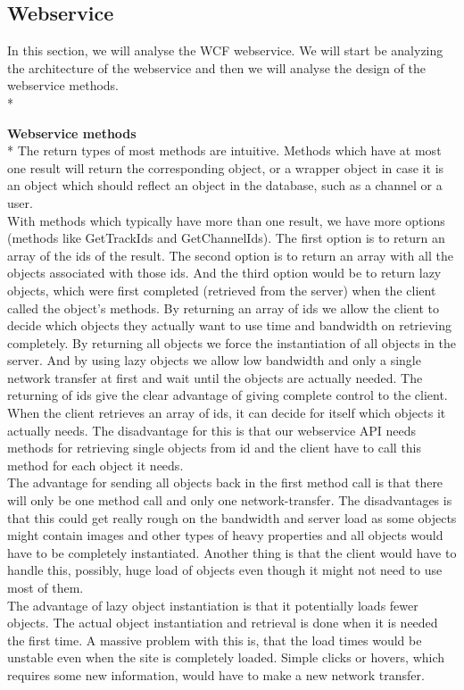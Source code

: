 \documentclass[a4paper,11pt,report]{article}
\begin{document}
{\subsection{Webservice}
In this section, we will analyse the WCF webservice. We will start be analyzing the architecture of the webservice and then we will analyse the design of the webservice methods.  \\*

\textbf{Webservice methods} \\*
The return types of most methods are intuitive. Methods which have at most one result will return the corresponding object, or a wrapper object in case it is an object which should reflect an object in the database, such as a channel or a user. \\
With methods which typically have more than one result, we have more options (methods like GetTrackIds and GetChannelIds). 
The first option is to return an array of the ids of the result. The second option is to return an array with all the objects associated with those ids. And the third option would be to return lazy objects, which were first completed (retrieved from the server) when the client called the object's methods. By returning an array of ids we allow the client to decide which objects they actually want to use time and bandwidth on retrieving completely. By returning all objects we force the instantiation of all objects in the server. And by using lazy objects we allow low bandwidth and only a single network transfer at first and wait until the objects are actually needed.
The returning of ids give the clear advantage of giving complete control to the client. When the client retrieves an array of ids, it can decide for itself which objects it actually needs. The disadvantage for this is that our webservice API needs methods for retrieving single objects from id and the client have to call this method for each object it needs. \\
The advantage for sending all objects back in the first method call is that there will only be one method call and only one network-transfer. The disadvantages is that this could get really rough on the bandwidth and server load as some objects might contain images and other types of heavy properties and all objects would have to be completely instantiated. Another thing is that the client would have to handle this, possibly, huge load of objects even though it might not need to use most of them. \\
The advantage of lazy object instantiation is that it potentially loads fewer objects. The actual object instantiation and retrieval is done when it is needed the first time. A massive problem with this is, that the load times would be unstable even when the site is completely loaded. Simple clicks or hovers, which requires some new information, would have to make a new network transfer. \\
}
\end{document}
